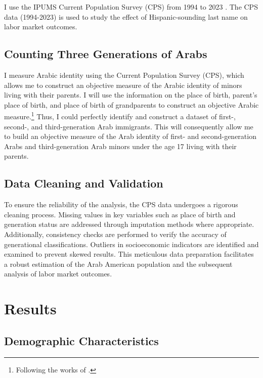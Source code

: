 I use the IPUMS Current Population Survey (CPS) from 1994 to 2023 \autocite{floodsarahIntegratedPublicUse2021a}. The CPS data (1994-2023) is used to study the effect of Hispanic-sounding last name on labor market outcomes. 

\subsection{Counting Three Generations of Arabs}\label{subsec:cps}

I measure Arabic identity using the Current Population Survey (CPS), which allows me to construct an objective measure of the Arabic identity of minors living with their parents. I will use the information on the place of birth, parent's place of birth, and place of birth of grandparents to construct an objective Arabic measure.\footnote{Following the works of \textcite{antmanEthnicAttritionObserved2016}.} Thus, I could perfectly identify and construct a dataset of first-, second-, and third-generation Arab immigrants. This will consequently allow me to build an objective measure of the Arab identity of first- and second-generation Arabs and third-generation Arab minors under the age 17 living with their parents. 
\subsection{Data Cleaning and Validation}\label{subsec:data_cleaning}

To ensure the reliability of the analysis, the CPS data undergoes a rigorous cleaning process. Missing values in key variables such as place of birth and generation status are addressed through imputation methods where appropriate. Additionally, consistency checks are performed to verify the accuracy of generational classifications. Outliers in socioeconomic indicators are identified and examined to prevent skewed results. This meticulous data preparation facilitates a robust estimation of the Arab American population and the subsequent analysis of labor market outcomes.

\section{Results}\label{sec:results}

\subsection{Demographic Characteristics}\label{subsec:demographic_characteristics}

